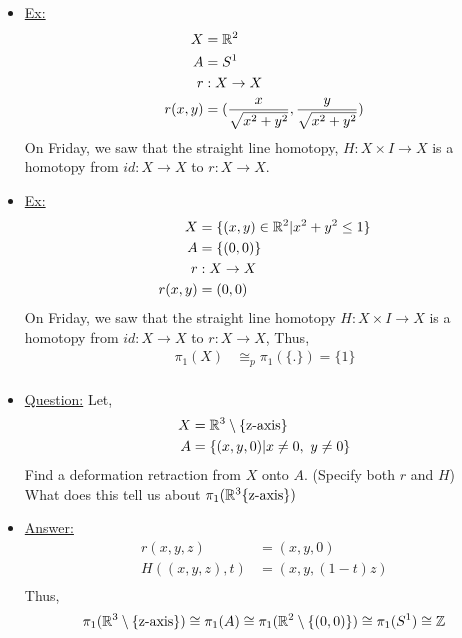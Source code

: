 \documentclass[../notes.tex]{subfiles}
\begin{document}
    \begin{itemize}
    \item\underline{Ex:}
        \begin{align*}
            X&=\mathbb{R}^2\\
            A&=S^1\\
            r&:X\rightarrow X\\
            r(x,y)&=(\frac{x}{\sqrt{x^2+y^2}},\frac{y}{\sqrt{x^2+y^2}})
        \end{align*}
        On Friday, we saw that the straight line homotopy, $H:X\times I\rightarrow X$
        is a homotopy from $id:X\rightarrow X$ to $r:X\rightarrow X$.
    \item \underline{Ex:}
        \begin{align*}
            X&=\{(x,y)\in \mathbb{R}^2| x^2+y^2\leq 1\}\\
            A&=\{(0,0)\}\\
            r&: X\rightarrow X\\
            r(x,y)&=(0,0)\\
        \end{align*}
        On Friday, we saw that the straight line homotopy $H:X\times I \rightarrow X$ is
        a homotopy from $id:X\rightarrow X$ to $r:X\rightarrow X$,
        Thus,
        \begin{align*}
            \pi_1(X)&\cong_{p}\pi_1(\{.\})=\{1\}\\
        \end{align*}
    \item \underline{Question:} Let,
        \begin{align*}
            X&=\mathbb{R}^3\setminus \{\text{z-axis}\}\\
            A&=\{(x,y,0)| x\neq 0,\ y\neq 0\}\\
        \end{align*}
        Find a deformation retraction from $X$ onto $A$. (Specify both $r$ and $H$)\\
        What does this tell us about $\pi_1(\mathbb{R}^3\{\text{z-axis}\})$
    \item \underline{Answer:}
        \begin{align*}
            r(x,y,z)&=(x,y,0)\\
            H((x,y,z),t)&=(x,y, (1-t)z)\\
        \end{align*}
        Thus,
        \begin{align*}
            \pi_1(\mathbb{R}^3\setminus\{\text{z-axis}\})\cong \pi_1(A)\cong \pi_1(\mathbb{R}^2\setminus\{(0,0)\})\cong \pi_1(S^1)\cong \mathbb{Z}\\
        \end{align*}
    \end{itemize}
\end{document}
